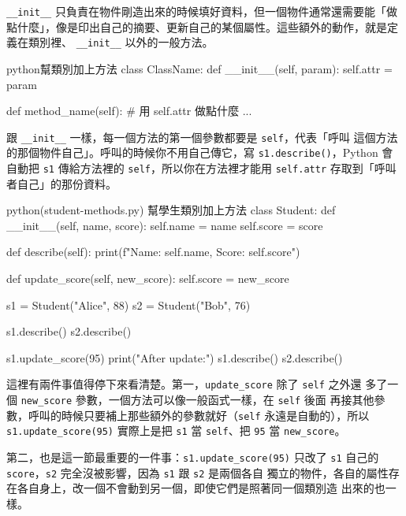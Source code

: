 \texttt{\_\_init\_\_} 只負責在物件剛造出來的時候填好資料，但一個物件通常還需要能「做
點什麼」，像是印出自己的摘要、更新自己的某個屬性。這些額外的動作，就是定義在類別裡、
\texttt{\_\_init\_\_} 以外的一般方法。

\begin{code}{python}{幫類別加上方法}
class ClassName:
    def __init__(self, param):
        self.attr = param

    def method_name(self):
        # 用 self.attr 做點什麼
        ...
\end{code}

跟 \texttt{\_\_init\_\_} 一樣，每一個方法的第一個參數都要是 \texttt{self}，代表「呼叫
這個方法的那個物件自己」。呼叫的時候你不用自己傳它，寫 \texttt{s1.describe()}，Python
會自動把 \texttt{s1} 傳給方法裡的 \texttt{self}，所以你在方法裡才能用
\texttt{self.attr} 存取到「呼叫者自己」的那份資料。

\begin{example}{python}{(student-methods.py) 幫學生類別加上方法}
class Student:
    def __init__(self, name, score):
        self.name = name
        self.score = score

    def describe(self):
        print(f"Name: {self.name}, Score: {self.score}")

    def update_score(self, new_score):
        self.score = new_score


s1 = Student("Alice", 88)
s2 = Student("Bob", 76)

s1.describe()
s2.describe()

s1.update_score(95)
print("After update:")
s1.describe()
s2.describe()
\end{example}


這裡有兩件事值得停下來看清楚。第一，\texttt{update\_score} 除了 \texttt{self} 之外還
多了一個 \texttt{new\_score} 參數，一個方法可以像一般函式一樣，在 \texttt{self} 後面
再接其他參數，呼叫的時候只要補上那些額外的參數就好（\texttt{self} 永遠是自動的），所以
\texttt{s1.update\_score(95)} 實際上是把 \texttt{s1} 當 \texttt{self}、把 \texttt{95}
當 \texttt{new\_score}。

第二，也是這一節最重要的一件事：\texttt{s1.update\_score(95)} 只改了 \texttt{s1} 自己的
\texttt{score}，\texttt{s2} 完全沒被影響，因為 \texttt{s1} 跟 \texttt{s2} 是兩個各自
獨立的物件，各自的屬性存在各自身上，改一個不會動到另一個，即使它們是照著同一個類別造
出來的也一樣。

